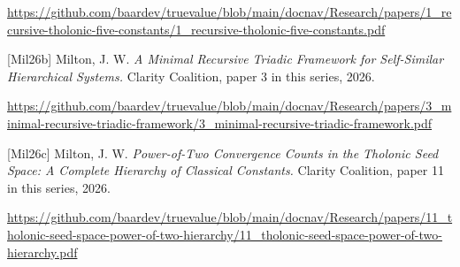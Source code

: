 \documentclass[
  11pt,
  letterpaper,
]{article}
\begin{document}
\url{https://github.com/baardev/truevalue/blob/main/docnav/Research/papers/1_recursive-tholonic-five-constants/1_recursive-tholonic-five-constants.pdf}

{[}Mil26b{]} Milton, J. W. \emph{A Minimal Recursive Triadic Framework
for Self-Similar Hierarchical Systems.} Clarity Coalition, paper 3 in
this series, 2026.

\url{https://github.com/baardev/truevalue/blob/main/docnav/Research/papers/3_minimal-recursive-triadic-framework/3_minimal-recursive-triadic-framework.pdf}

{[}Mil26c{]} Milton, J. W. \emph{Power-of-Two Convergence Counts in the
Tholonic Seed Space: A Complete Hierarchy of Classical Constants.}
Clarity Coalition, paper 11 in this series, 2026.

\url{https://github.com/baardev/truevalue/blob/main/docnav/Research/papers/11_tholonic-seed-space-power-of-two-hierarchy/11_tholonic-seed-space-power-of-two-hierarchy.pdf}
\end{document}
